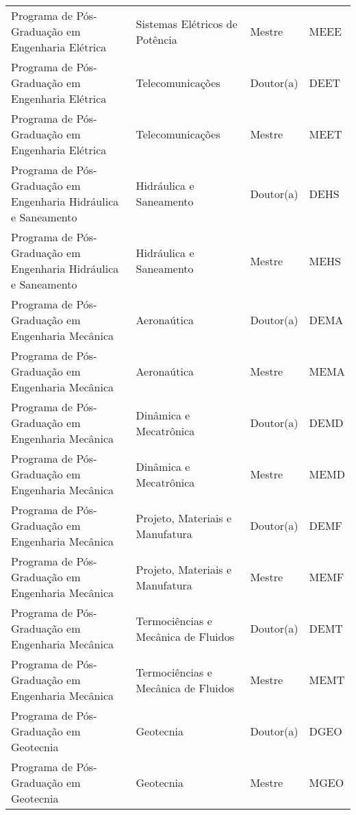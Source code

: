 \begin{apendicesenv}
\begin{quadro}[htb]
\begin{tabular}{|p{6.0cm}|p{4.5cm}|p{2.0cm}|p{1.75cm}|}
Programa de P\'os-Gradua\c{c}\~ao em Engenharia El\'etrica & Sistemas El\'etricos de Pot\^encia & Mestre & MEEE \\
Programa de P\'os-Gradua\c{c}\~ao em Engenharia El\'etrica & Telecomunica\c{c}\~oes & Doutor(a) & DEET \\
Programa de P\'os-Gradua\c{c}\~ao em Engenharia El\'etrica & Telecomunica\c{c}\~oes & Mestre & MEET \\
Programa de P\'os-Gradua\c{c}\~ao em Engenharia Hidr\'aulica e Saneamento & Hidr\'aulica e Saneamento & Doutor(a) & DEHS \\
Programa de P\'os-Gradua\c{c}\~ao em Engenharia Hidr\'aulica e Saneamento & Hidr\'aulica e Saneamento & Mestre & MEHS \\
Programa de P\'os-Gradua\c{c}\~ao em Engenharia Mec\^anica & Aerona\'utica & Doutor(a) & DEMA \\
Programa de P\'os-Gradua\c{c}\~ao em Engenharia Mec\^anica & Aerona\'utica & Mestre & MEMA \\
Programa de P\'os-Gradua\c{c}\~ao em Engenharia Mec\^anica & Din\^amica e Mecatr\^onica & Doutor(a) & DEMD \\
Programa de P\'os-Gradua\c{c}\~ao em Engenharia Mec\^anica & Din\^amica e Mecatr\^onica & Mestre & MEMD \\
Programa de P\'os-Gradua\c{c}\~ao em Engenharia Mec\^anica & Projeto, Materiais e Manufatura  & Doutor(a) & DEMF \\
Programa de P\'os-Gradua\c{c}\~ao em Engenharia Mec\^anica & Projeto, Materiais e Manufatura  & Mestre & MEMF \\
Programa de P\'os-Gradua\c{c}\~ao em Engenharia Mec\^anica & Termoci\^encias e Mec\^anica de Fluidos & Doutor(a) & DEMT \\
Programa de P\'os-Gradua\c{c}\~ao em Engenharia Mec\^anica & Termoci\^encias e Mec\^anica de Fluidos & Mestre & MEMT \\
Programa de P\'os-Gradua\c{c}\~ao em Geotecnia & Geotecnia & Doutor(a) & DGEO \\
Programa de P\'os-Gradua\c{c}\~ao em Geotecnia & Geotecnia & Mestre & MGEO \\
    
\end{tabular}
\end{quadro}


\end{apendicesenv}
